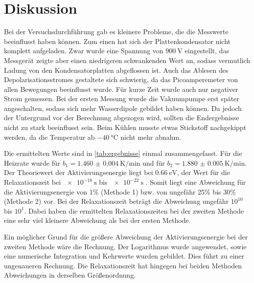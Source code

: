 \section{Diskussion}
\label{sec:Diskussion}

Bei der Versuchsdurchführung gab es kleinere Probleme, die die Messwerte beeinflusst haben können.
Zum einen hat sich der Plattenkondensator nicht komplett aufgeladen.
Zwar wurde eine Spannung von $\SI{900}{\volt}$ eingestellt, das Messgerät zeigte aber einen niedrigeren schwankenden Wert an, sodass vermutlich Ladung 
von den Kondensatorplatten abgeflossen ist.
Auch das Ablesen des Depolarisationsstromes gestaltete sich schwierig, da das Picoamperemeter von allen Bewegungen beeinflusst wurde. 
Für kurze Zeit wurde auch nur negativer Strom gemessen.
Bei der ersten Messung wurde die Vakuumpumpe erst später angeschalten, sodass sich mehr Wasserdipole gebildet haben können. Da jedoch der Untergrund 
vor der Berechnung abgezogen wird, sollten die Endergebnisse nicht zu stark beeinflusst sein. 
Beim Kühlen musste etwas Stickstoff nachgekippt werden, da die Temperatur ab $\SI{-40}{\celsius}$ nicht mehr abnahm.

\noindent
Die ermittelten Werte sind in \autoref{tab:ergebnisse} einmal zusammengefasst.
Für die Heizrate wurde für $b_1 = \SI{1.460(4)}{\kelvin\per\minute}$ und für $b_2 = \SI{1.880(5)}{\kelvin\per\minute}$.
Der Theoriewert der Aktivierungsenergie liegt bei $\SI{0.66}{\electronvolt}$, der Wert für die Relaxationszeit bei $\SI{e-18}{\second}$ bis $\SI{e-22}{\second}$ \cite{muccillo}.
Somit liegt eine Abweichung für die Aktivierungsenergie von 1\% (Methode 1) bzw. von ungefähr 25\% bis 30\% (Methode 2) vor.
Bei der Relaxationszeit beträgt die Abweichung ungefähr $10^{10}$ bis $10^{1}$.
Dabei haben die ermittelten Relaxationszeiten bei der zweiten Methode eine sehr viel kleinere Abweichung als bei der ersten Methode.

\noindent
Ein möglicher Grund für die größere Abweichung der Aktivierungsenergie bei der zweiten Methode wäre die Rechnung.
Der Logarithmus wurde angewendet, sowie eine numerische Integration und Kehrwerte wurden gebildet.
Dies führt zu einer ungenaueren Rechnung.
Die Relaxationszeit hat hingegen bei beiden Methoden Abweichungen in derselben Größenordnung.

